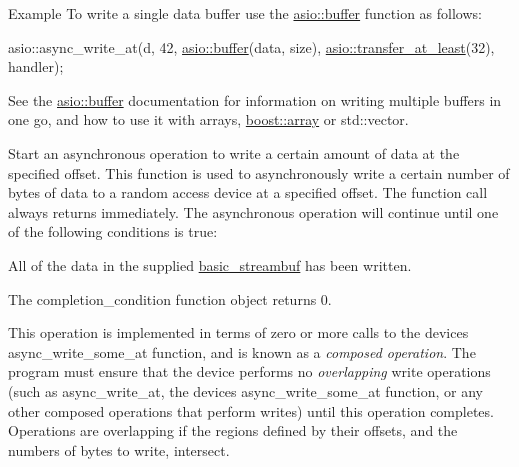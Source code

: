 \begin{DoxyParagraph}{Example}
To write a single data buffer use the \hyperlink{group__buffer}{asio\+::buffer} function as follows\+: 
\begin{DoxyCode}
asio::async\_write\_at(d, 42,
   \hyperlink{group__buffer_ga1ed66e401559cbfd19595392f653b47c}{asio::buffer}(data, size),
   \hyperlink{group__completion__condition_ga2b10af704afcd6c7ed7f0d3b740033ef}{asio::transfer\_at\_least}(32),
   handler); 
\end{DoxyCode}
 See the \hyperlink{group__buffer}{asio\+::buffer} documentation for information on writing multiple buffers in one go, and how to use it with arrays, \hyperlink{classboost_1_1array}{boost\+::array} or std\+::vector.
\end{DoxyParagraph}
Start an asynchronous operation to write a certain amount of data at the specified offset. This function is used to asynchronously write a certain number of bytes of data to a random access device at a specified offset. The function call always returns immediately. The asynchronous operation will continue until one of the following conditions is true\+:

\begin{DoxyItemize}
\item All of the data in the supplied \hyperlink{classasio_1_1basic__streambuf}{basic\+\_\+streambuf} has been written.\end{DoxyItemize}
\begin{DoxyItemize}
\item The completion\+\_\+condition function object returns 0.\end{DoxyItemize}
This operation is implemented in terms of zero or more calls to the device\textquotesingle{}s async\+\_\+write\+\_\+some\+\_\+at function, and is known as a {\itshape composed operation}. The program must ensure that the device performs no {\itshape overlapping} write operations (such as async\+\_\+write\+\_\+at, the device\textquotesingle{}s async\+\_\+write\+\_\+some\+\_\+at function, or any other composed operations that perform writes) until this operation completes. Operations are overlapping if the regions defined by their offsets, and the numbers of bytes to write, intersect.


